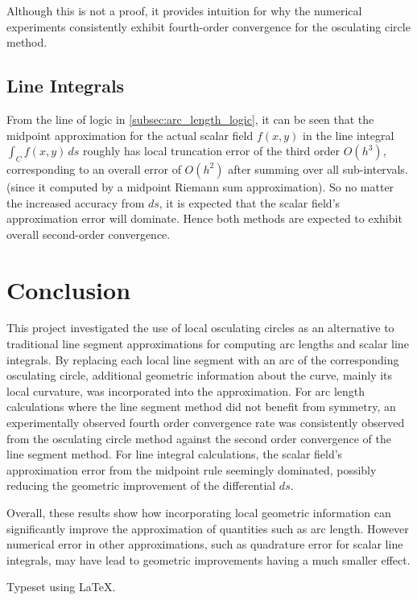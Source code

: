 \documentclass{article}
\begin{document}
Although this is not a proof, it provides intuition for why the numerical experiments consistently exhibit fourth-order convergence for the osculating circle method.

\subsection{Line Integrals}
From the line of logic in \ref{subsec:arc_length_logic}, it can be seen that the midpoint approximation for the actual scalar field $f(x,y)$ in the line integral $\int_{C}f(x,y)\,ds$ roughly has local truncation error of the third order $O(h^3)$, corresponding to an overall error of $O(h^2)$ after summing over all sub-intervals. (since it computed by a midpoint Riemann sum approximation). So no matter the increased accuracy from $ds$, it is expected that the scalar field's approximation error will dominate. Hence both methods are expected to exhibit overall second-order convergence.

\newpage

\section{Conclusion}
This project investigated the use of local osculating circles as an alternative to traditional line segment approximations for computing arc lengths and scalar line integrals. By replacing each local line segment with an arc of the corresponding osculating circle, additional geometric information about the curve, mainly its local curvature, was incorporated into the approximation. For arc length calculations where the line segment method did not benefit from symmetry, an experimentally observed fourth order convergence rate was consistently observed from the osculating circle method against the second order convergence of the line segment method. For line integral calculations, the scalar field's approximation error from the midpoint rule seemingly dominated, possibly reducing the geometric improvement of the differential $ds$.

Overall, these results show how incorporating local geometric information can significantly improve the approximation of quantities such as arc length. However numerical error in other approximations, such as quadrature error for scalar line integrals, may have lead to geometric improvements having a much smaller effect.

\vfill
\begin{center}
\small
Typeset using \LaTeX.
\end{center}
\end{document}

